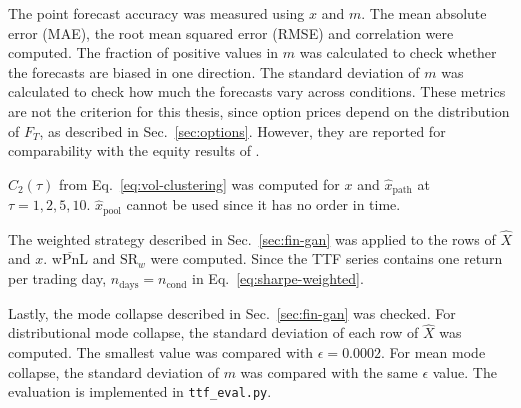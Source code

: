The point forecast accuracy was measured using $x$ and $m$. The mean absolute error (MAE), the root mean squared error (RMSE) and correlation were computed. The fraction of positive values in $m$ was calculated to check whether the forecasts are biased in one direction. The standard deviation of $m$ was calculated to check how much the forecasts vary across conditions. These metrics are not the criterion for this thesis, since option prices depend on the distribution of $F_T$, as described in Sec.~\ref{sec:options}. However, they are reported for comparability with the equity results of \textcite{vuleticFinGANForecastingClassifying2024}.

$C_2(\tau)$ from Eq.~\ref{eq:vol-clustering} was computed for $x$ and $\hat{x}_{\mathrm{path}}$ at $\tau=1, 2, 5, 10$. $\hat{x}_{\mathrm{pool}}$ cannot be used since it has no order in time.

The weighted strategy described in Sec.~\ref{sec:fin-gan} was applied to the rows of $\hat{X}$ and $x$. $\overline{\mathrm{wPnL}}$ and $\mathrm{SR}_{w}$ were computed.  Since the TTF series contains one return per trading day, $n_{\text{days}} = n_{\mathrm{cond}}$ in Eq.~\ref{eq:sharpe-weighted}.

Lastly, the mode collapse described in Sec.~\ref{sec:fin-gan} was checked. For distributional mode collapse, the standard deviation of each row of $\hat{X}$ was computed. The smallest value was compared with $\epsilon=0.0002$. For mean mode collapse, the standard deviation of $m$ was compared with the same $\epsilon$ value. The evaluation is implemented in \texttt{ttf\_eval.py}.